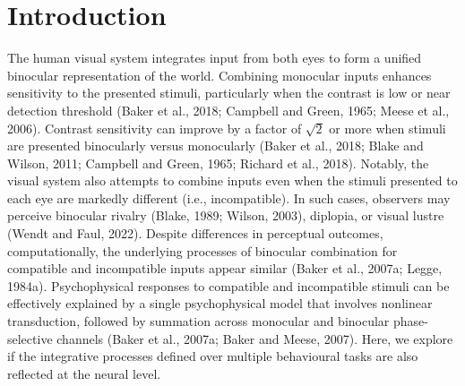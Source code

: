 \documentclass[review,
  12pt,
]{elsarticle}
\begin{document}

  

\section{Introduction}\label{introduction}

The human visual system integrates input from both eyes to form a
unified binocular representation of the world. Combining monocular
inputs enhances sensitivity to the presented stimuli, particularly when
the contrast is low or near detection threshold (Baker et al., 2018;
Campbell and Green, 1965; Meese et al., 2006). Contrast sensitivity can
improve by a factor of \(\sqrt{2}\) or more when stimuli are presented
binocularly versus monocularly (Baker et al., 2018; Blake and Wilson,
2011; Campbell and Green, 1965; Richard et al., 2018). Notably, the
visual system also attempts to combine inputs even when the stimuli
presented to each eye are markedly different (i.e., incompatible). In
such cases, observers may perceive binocular rivalry (Blake, 1989;
Wilson, 2003), diplopia, or visual lustre (Wendt and Faul, 2022).
Despite differences in perceptual outcomes, computationally, the
underlying processes of binocular combination for compatible and
incompatible inputs appear similar (Baker et al., 2007a; Legge, 1984a).
Psychophysical responses to compatible and incompatible stimuli can be
effectively explained by a single psychophysical model that involves
nonlinear transduction, followed by summation across monocular and
binocular phase-selective channels (Baker et al., 2007a; Baker and
Meese, 2007). Here, we explore if the integrative processes defined over
multiple behavioural tasks are also reflected at the neural level.
\end{document}
